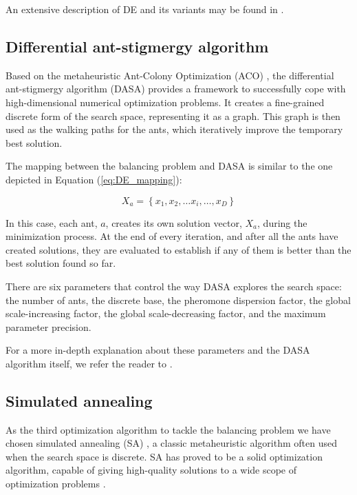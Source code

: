 An extensive description of DE and its variants may be found in \cite{price2005differential_evolution}.


\subsection{Differential ant-stigmergy algorithm}

Based on the metaheuristic Ant-Colony Optimization (ACO) \cite{dorigo2006ant_colony_optimization},
the differential ant-stigmergy algorithm (DASA) \cite{korosec2010_DASA}
provides a framework to successfully cope with high-dimensional numerical
optimization problems. It creates a fine-grained discrete form of
the search space, representing it as a graph. This graph is then used
as the walking paths for the ants, which iteratively improve the temporary
best solution.

The mapping between the balancing problem and DASA is similar to the
one depicted in Equation (\ref{eq:DE_mapping}):

\begin{equation}
X_{a}=\left\{ x_{1},x_{2},\ldots x_{i},\ldots,x_{D}\right\} \label{eq:DASA_mapping}
\end{equation}


In this case, each ant, $a$, creates its own solution vector, $X_{a}$,
during the minimization process. At the end of every iteration, and
after all the ants have created solutions, they are evaluated to establish
if any of them is better than the best solution found so far.

There are six parameters that control the way DASA explores the search
space: the number of ants, the discrete base, the pheromone dispersion
factor, the global scale-increasing factor, the global scale-decreasing
factor, and the maximum parameter precision.

For a more in-depth explanation about these parameters and the DASA
algorithm itself, we refer the reader to \cite{korosec2010_DASA}.


\subsection{Simulated annealing}

As the third optimization algorithm to tackle the balancing problem
we have chosen simulated annealing (SA) \cite{Kirkpatrick_OptimizationBySimulatesAnnealing},
a classic metaheuristic algorithm often used when the search space
is discrete. SA has proved to be a solid optimization algorithm, capable
of giving high-quality solutions to a wide scope of optimization problems
\cite{Suman_SurveyOfSimulatedAnnealing}.

